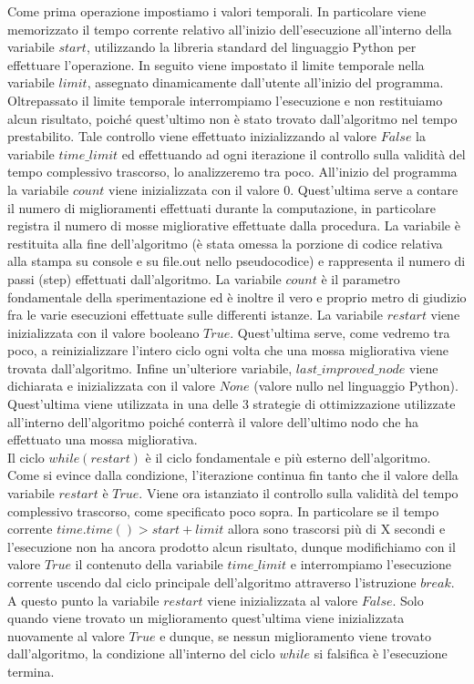 Come prima operazione impostiamo i valori temporali. In particolare viene memorizzato il tempo corrente relativo all'inizio dell'esecuzione all'interno della variabile $start$, utilizzando la libreria standard del linguaggio Python per effettuare l'operazione. In seguito viene impostato il limite temporale nella variabile $limit$, assegnato dinamicamente dall'utente all'inizio del programma. Oltrepassato il limite temporale interrompiamo l'esecuzione e non restituiamo alcun risultato, poiché quest'ultimo non è stato trovato dall'algoritmo nel tempo prestabilito. Tale controllo viene effettuato inizializzando al valore $False$ la variabile $time\_limit$ ed effettuando ad ogni iterazione il controllo sulla validità del tempo complessivo trascorso, lo analizzeremo tra poco. All'inizio del programma la variabile $count$ viene inizializzata con il valore $0$. Quest'ultima serve a contare il numero di miglioramenti effettuati durante la computazione, in particolare registra il numero di mosse migliorative effettuate dalla procedura. La variabile è restituita alla fine dell'algoritmo (è stata omessa la porzione di codice relativa alla stampa su console e su file.out nello pseudocodice) e rappresenta il numero di passi (step) effettuati dall'algoritmo. La variabile $count$ è il parametro fondamentale della sperimentazione ed è inoltre il vero e proprio metro di giudizio fra le varie esecuzioni effettuate sulle differenti istanze. La variabile $restart$ viene inizializzata con il valore booleano $True$. Quest'ultima serve, come vedremo tra poco, a reinizializzare l'intero ciclo ogni volta che una mossa migliorativa viene trovata dall'algoritmo. Infine un'ulteriore variabile, $last\_improved\_node$ viene dichiarata e inizializzata con il valore $None$ (valore nullo nel linguaggio Python). Quest'ultima viene utilizzata in una delle 3 strategie di ottimizzazione utilizzate all'interno dell'algoritmo poiché conterrà il valore dell'ultimo nodo che ha effettuato una mossa migliorativa.\\
Il ciclo $while(restart)$ è il ciclo fondamentale e più esterno dell'algoritmo. Come si evince dalla condizione, l'iterazione continua fin tanto che il valore della variabile $restart$ è $True$. Viene ora istanziato il controllo sulla validità del tempo complessivo trascorso, come specificato poco sopra. In particolare se il tempo corrente $time.time() > start + limit$ allora sono trascorsi più di X secondi e l'esecuzione non ha ancora prodotto alcun risultato, dunque modifichiamo con il valore $True$ il contenuto della variabile $time\_limit$ e interrompiamo l'esecuzione corrente uscendo dal ciclo principale dell'algoritmo attraverso l'istruzione $break$. A questo punto la variabile $restart$ viene inizializzata al valore $False$. Solo quando viene trovato un miglioramento quest'ultima viene inizializzata nuovamente al valore $True$ e dunque, se nessun miglioramento viene trovato dall'algoritmo, la condizione all'interno del ciclo $while$ si falsifica è l'esecuzione termina.\\
